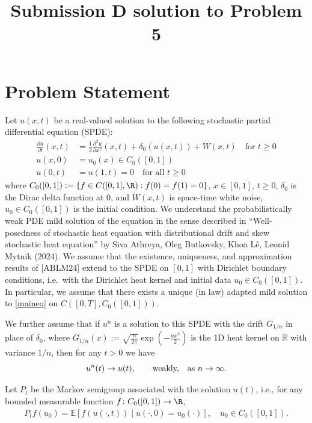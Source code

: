 \title{Submission D solution to Problem 5}
\date{}
\maketitle


\section*{Problem Statement}

Let $u(x,t)$ be a real-valued solution to the following stochastic partial differential equation (SPDE):
\begin{align}\tag{$*$}\label{maineq}
    \frac{\partial u}{\partial t}(x,t) &= \frac{1}{2} \frac{\partial^2 u}{\partial x^2}(x,t) + \delta_0(u(x,t)) +  \dot{W}(x,t) \quad\text{for }t \geq 0\\
    u(x,0) &= u_0(x)\in C_0([0,1])\nonumber\\
    u(0,t) &= u(1,t)=0\quad\text{for all }t\geq0    \nonumber
\end{align}
where $C_0([0,1]):=\{f\in C([0,1],\R): f(0)=f(1)=0\}$, $x \in [0,1]$, $t \geq 0$, $\delta_0$ is the Dirac delta function at $0$, and $\dot{W}(x,t)$ is space-time white noise, $u_0\in C_0([0,1])$ is the initial condition. We understand the probabilistically weak PDE mild solution of the equation in the sense described in ``Well-posedness of stochastic heat equation with distributional drift and skew stochastic heat equation'' by Siva Athreya, Oleg Butkovsky, Khoa L\^{e}, Leonid Mytnik (2024). 
We assume that the existence, uniqueness, and approximation results of [ABLM24] extend to the SPDE on $[0,1]$ with Dirichlet boundary conditions, i.e.\ with the Dirichlet heat kernel and initial data $u_0\in C_0([0,1])$. In particular, we assume that there exists a unique (in law) adapted mild solution to \eqref{maineq} on $C([0,T],C_0([0,1]))$.

We further assume that if $u^n$ is a solution to this SPDE with the drift $G_{1/n}$ in place of $\delta_0$, where $G_{1/n}(x):=\sqrt{\frac{n}{2\pi}} \exp(-\frac{n x^2}{2})$ is the 1D heat kernel on $\mathbb{R}$ with variance $1/n$, then for any $t>0$ we have 
\begin{equation*}
u^n(t)\to u(t),\qquad\text{weakly, \,\, as $n\to\infty$}.
\end{equation*}

Let $P_t$ be the Markov semigroup associated with the solution $u(t)$, i.e., for any bounded measurable function $f\colon C_0([0,1])\to\R$,
\begin{align}
    P_t f(u_0) = \mathbb{E}[f(u(\cdot,t)) \mid u(\cdot,0) = u_0(\cdot)],\quad u_0\in C_0([0,1]).
\end{align}

